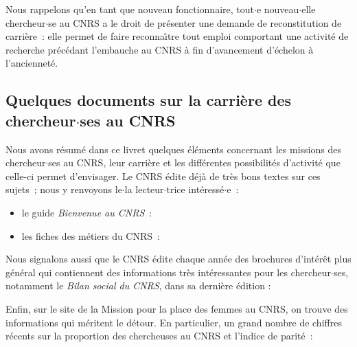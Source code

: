 


Nous rappelons qu'en tant que nouveau fonctionnaire, tout$\cdot$e nouveau$\cdot$elle chercheur$\cdot$se au CNRS
a le droit de pr\'esenter une demande de
reconstitution de carri\`ere~: elle permet de faire
reconna\^\i tre tout emploi comportant une activit\'e de
recherche pr\'ec\'edant l'embauche au CNRS \`a fin d'avancement
d'\'echelon \`a l'anciennet\'e.

\subsection{Quelques documents sur la carri\`ere des chercheur$\cdot$ses
au CNRS}

Nous avons r\'esum\'e dans ce livret quelques \'el\'ements
 concernant les missions des chercheur$\cdot$ses au CNRS, leur
carri\`ere et les diff\'erentes possibilit\'es d'activit\'e
que celle-ci permet d'envisager. Le CNRS \'edite d\'ej\`a de
tr\`es bons textes sur ces sujets~; nous y renvoyons le$\cdot$la lecteur$\cdot$trice
int\'eress\'e$\cdot$e~:
\begin{itemize}
\item le guide {\em Bienvenue au CNRS}~:\\
\item les fiches des m\'etiers du CNRS~:\\
\end{itemize}

Nous signalons aussi que le CNRS \'edite chaque ann\'ee des
brochures d'int\'er\^et plus g\'en\'eral qui contien\-nent
des informations tr\`es int\'eressantes pour les chercheur$\cdot$ses,
notamment le {\em Bilan social du CNRS}, dans sa derni\`ere
\'edition :~\\


%
Enfin, sur le site de la Mission pour la place des femmes au CNRS,
on trouve des informations  qui m\'eritent le d\'etour. En particulier, un grand nombre de chiffres r\'ecents sur la proportion des chercheuses au CNRS
et l'indice de parit\'e~:\\

